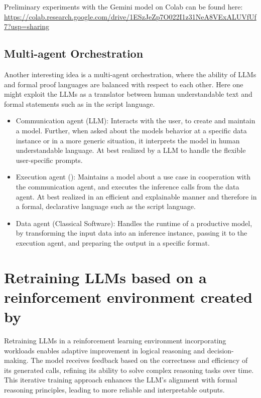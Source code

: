 \documentclass[aps,onecolumn,nofootinbib,pra]{article}
\begin{document}
Preliminary experiments with the Gemini model on Colab can be found here:
\url{https://colab.research.google.com/drive/1ESzJeZp7O022I1z31NeA8VExALUVfUf7?usp=sharing}

\subsection{Multi-agent Orchestration}

Another interesting idea is a multi-agent orchestration, where the ability of LLMs and formal proof languages are balanced with respect to each other.
Here one might exploit the LLMs as a translator between human understandable text and formal statements such as in the \tnreason script language.
\begin{itemize}
	\item Communication agent (LLM): 
		Interacts with the user, to create and maintain a \tnreason model. 
		Further, when asked about the models behavior at a specific data instance or in a more generic situation, it interprets the model in human understandable language.
		At best realized by a LLM to handle the flexible user-specific prompts.
	\item Execution agent (\tnreason): 
		Maintains a model about a use case in cooperation with the communication agent, and executes the inference calls from the data agent.
		At best realized in an efficient and explainable manner and therefore in a formal, declarative language such as the \tnreason script language.
	\item Data agent (Classical Software): 
		Handles the runtime of a productive model, by transforming the input data into an inference instance, passing it to the execution agent, and preparing the output in a specific format.
\end{itemize}

\section{Retraining LLMs based on a reinforcement environment created by \tnreason}

Retraining LLMs in a reinforcement learning environment incorporating \tnreason workloads enables adaptive improvement in logical reasoning and decision-making. 
The model receives feedback based on the correctness and efficiency of its generated \tnreason calls, refining its ability to solve complex reasoning tasks over time. 
This iterative training approach enhances the LLM’s alignment with formal reasoning principles, leading to more reliable and interpretable outputs.
\end{document}
